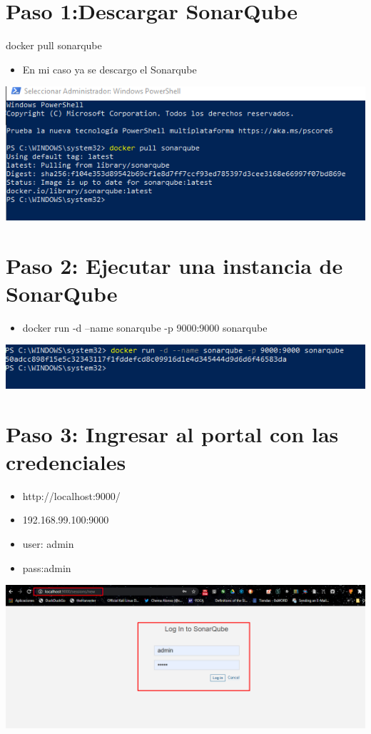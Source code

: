 \section{Paso 1:Descargar SonarQube} 
docker pull sonarqube
\begin{itemize}
    \item  En mi caso ya se descargo el Sonarqube
\end{itemize}
\begin{center}
\includegraphics[width=\columnwidth]{images/1}\newline
\end{center}
\section{Paso 2: Ejecutar una instancia de SonarQube } 
\begin{itemize}
    \item docker run -d --name sonarqube -p 9000:9000 sonarqube
\end{itemize}
\begin{center}
\includegraphics[width=\columnwidth]{images/2}\newline
\end{center}
\section{Paso 3: Ingresar al portal con las credenciales } 
\begin{itemize}
    \item http://localhost:9000/
    \item 192.168.99.100:9000
    \item user: admin
    \item pass:admin
\end{itemize}
\begin{center}
\includegraphics[width=\columnwidth]{images/3}\newline
\end{center}
